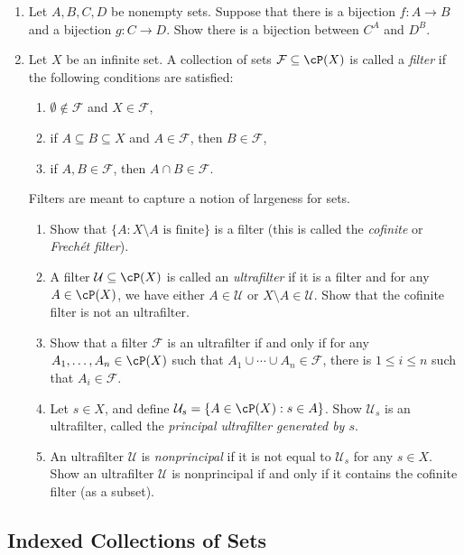 \begin{enumerate}
\item Let $A,B,C,D$ be nonempty sets. Suppose that there is a bijection $f : A \to B$ and a bijection $g : C \to D$. Show there is a bijection between $C^A$ and $D^B$.

\item Let $X$ be an infinite set. A collection of sets $\mathcal{F} \subseteq \cP(X)$ is called a \emph{filter} if the following conditions are satisfied:
\begin{enumerate}[label=(\arabic*)]
    \item $\emptyset \notin \mathcal{F}$ and $X \in \mathcal{F}$,
    \item if $A \subseteq B \subseteq X$ and $A \in \mathcal{F}$, then $B \in \mathcal{F}$,
    \item if $A,B \in \mathcal{F}$, then $A \cap B \in \mathcal{F}$.
\end{enumerate}
Filters are meant to capture a notion of largeness for sets.
\begin{enumerate}
    \item Show that $\{A : X \setminus A \text{ is finite}\}$ is a filter (this is called the \emph{cofinite} or \emph{Frech\'et filter}).
    \item A filter $\mathcal{U} \subseteq \cP(X)$ is called an \emph{ultrafilter} if it is a filter and for any $A \in \cP(X)$, we have either $A \in \mathcal{U}$ or $X \setminus A \in \mathcal{U}$. Show that the cofinite filter is not an ultrafilter.
    \item Show that a filter $\mathcal{F}$ is an ultrafilter if and only if for any $A_1,\ldots,A_n \in \cP(X)$ such that $A_1 \cup \cdots \cup A_n \in \mathcal{F}$, there is $1 \leq i \leq n$ such that $A_i \in \mathcal{F}$.
    \item Let $s \in X$, and define $\mathcal{U}_s = \{A \in \cP(X) : s \in A\}$. Show $\mathcal{U}_s$ is an ultrafilter, called the \emph{principal ultrafilter generated by $s$}.
    \item An ultrafilter $\mathcal{U}$ is \emph{nonprincipal} if it is not equal to $\mathcal{U}_s$ for any $s \in X$. Show an ultrafilter $\mathcal{U}$ is nonprincipal if and only if it contains the cofinite filter (as a subset).
\end{enumerate}
\end{enumerate}
\newpage

\subsection{Indexed Collections of Sets}

